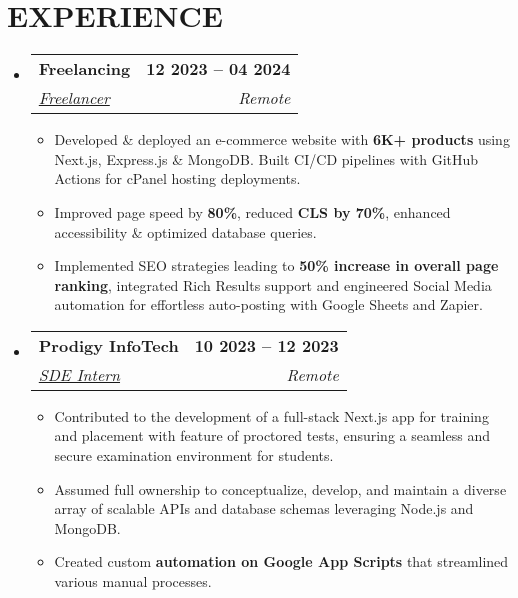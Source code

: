 \documentclass[letterpaper,11pt]{article}
\makeatletter
\newcommand{\resumeItem}[1]{
  \item\small{
    {#1 \vspace{-2pt}}
  }
}
\newcommand{\resumeSubheading}[4]{
  \vspace{-2pt}\item
    \begin{tabular*}{1.0\textwidth}[t]{l@{\extracolsep{\fill}}r}
      \textbf{\large#1} & \textbf{\small #2} \\
      \textit{\large#3} & \textit{\small #4} \\
      
    \end{tabular*}\vspace{-7pt}
}
\newcommand{\resumeSubHeadingListStart}{\begin{itemize}[leftmargin=0.0in, label={}]}
\newcommand{\resumeSubHeadingListEnd}{\end{itemize}}
\newcommand{\resumeItemListStart}{\begin{itemize}}
\newcommand{\resumeItemListEnd}{\end{itemize}\vspace{-5pt}}
\makeatother
\begin{document}
\section{EXPERIENCE}
  \resumeSubHeadingListStart

    \resumeSubheading
      {Freelancing \href{https://kumail.shop/}{\raisebox{-0.1\height}{{\faExternalLink*}} }}{12 2023 -- 04 2024} 
      {\underline{Freelancer}}{Remote}
      \resumeItemListStart
        \resumeItem{\normalsize{Developed \& deployed an e-commerce website with \textbf{6K+ products} using Next.js, Express.js \& MongoDB. Built CI/CD pipelines with GitHub Actions for cPanel hosting deployments.}}
        \resumeItem{\normalsize{Improved page speed by \textbf{80\%}, reduced \textbf{CLS by 70\%}, enhanced accessibility \& optimized database queries.}}
        \resumeItem{\normalsize{Implemented SEO strategies leading to \textbf{50\% increase in overall page ranking}, integrated Rich Results support and engineered Social Media automation for effortless auto-posting with Google Sheets and Zapier.}}  
      \resumeItemListEnd  
    \resumeSubheading
      {Prodigy InfoTech}{10 2023 -- 12 2023} 
      {\underline{SDE Intern}}{Remote}
      \resumeItemListStart
          \resumeItem{\normalsize{Contributed to the development of a full-stack Next.js app for training and placement with feature of proctored tests, ensuring a seamless and secure examination environment for students.}}
          \resumeItem{\normalsize{Assumed full ownership to conceptualize, develop, and maintain a diverse array of scalable APIs and database schemas leveraging Node.js and MongoDB.}}
          \resumeItem{\normalsize{Created custom \textbf{automation on Google App Scripts} that streamlined various manual processes.}}
      \resumeItemListEnd  

  \resumeSubHeadingListEnd
\vspace{-12pt}

\end{document}
